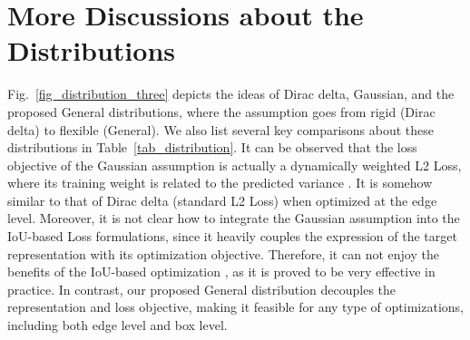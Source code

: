 \documentclass{article}
\begin{document}
\section{More Discussions about the Distributions}
Fig.~\ref{fig_distribution_three} depicts the ideas of Dirac delta, Gaussian, and the proposed General distributions, where the assumption goes from rigid (Dirac delta) to flexible (General). 
We also list several key comparisons about these distributions in Table~\ref{tab_distribution}. It can be observed that the loss objective of the Gaussian assumption is actually a dynamically weighted L2 Loss, where its training weight is related to the predicted variance . It is somehow similar to that of Dirac delta (standard L2 Loss) when optimized at the edge level. Moreover, it is not clear how to integrate the Gaussian assumption into the IoU-based Loss formulations, since it heavily couples the expression of the target representation with its optimization objective. Therefore, it can not enjoy the benefits of the IoU-based optimization \cite{rezatofighi2019generalized}, as it is proved to be very effective in practice. In contrast, our proposed General distribution decouples the representation and loss objective, making it feasible for any type of optimizations, including both edge level and box level.
\end{document}
